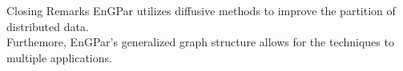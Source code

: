 \documentclass{beamer}
\begin{document}
\begin{textblock}{15.6}
\begin{textblock}{5.2}
    \begin{block}{\centering Closing Remarks}
      EnGPar utilizes diffusive methods to improve the partition of distributed data. \\
      Furthemore, EnGPar's generalized graph structure allows for the techniques to \\
      multiple applications.
    \end{block}
  \end{textblock}
\end{textblock}
\end{document}
